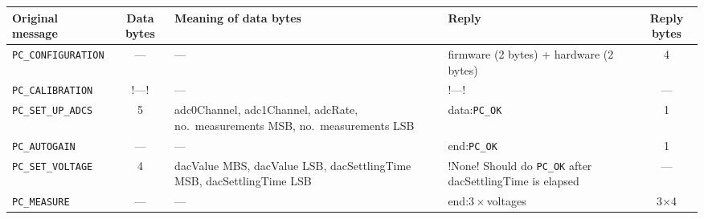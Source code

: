 \documentclass[11pt,a4paper,english]{article}
\begin{document}
\begin{center}
\begin{tabular}{lcp{}p{}c}\toprule
Original message            & Data bytes & Meaning of data bytes  & Reply & Reply bytes\\\midrule
\texttt{PC\_CONFIGURATION}  & ---        & ---								        & firmware (2 bytes) + hardware (2 bytes) & 4\\
\texttt{PC\_CALIBRATION}    & !---!      & ---                                        & !---!                     & ---\\
\texttt{PC\_SET\_UP\_ADCS}  & 5 & adc0Channel, adc1Channel, adcRate, no.\ measurements MSB, no.\ measurements LSB & data:\texttt{PC\_OK}  & 1\\
\texttt{PC\_AUTOGAIN}       & ---        & ---                                        & end:\texttt{PC\_OK}       & 1\\
\texttt{PC\_SET\_VOLTAGE}   & 4          & dacValue MBS, dacValue LSB, dacSettlingTime MSB, dacSettlingTime LSB & !None! Should do \texttt{PC\_OK} after dacSettlingTime is elapsed & ---\\
\texttt{PC\_MEASURE}        & ---        & ---                                        & end:$3\times$voltages     & 3$\times$4\\
\bottomrule
\end{tabular}
\end{center}
\end{document}
